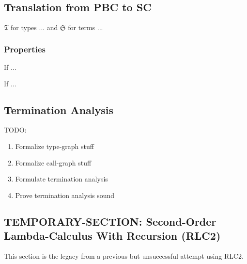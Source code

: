 \subsection{Translation from PBC to SC}

$\mathfrak{T}$ for types ... and $\mathfrak{S}$ for terms ...

\subsubsection{Properties}

\begin{lemma}[...]
  If ...
\end{lemma}

\begin{theorem}[...]
  If ...
\end{theorem}

\subsection{Termination Analysis}

TODO:

\begin{enumerate}
  \item Formalize type-graph stuff
  \item Formalize call-graph stuff
  \item Formulate termination analysis
  \item Prove termination analysis sound
\end{enumerate}

\subsection{TEMPORARY-SECTION: Second-Order Lambda-Calculus With Recursion (RLC2)}

This section is the legacy from a previous but unsuccessful attempt using RLC2.

